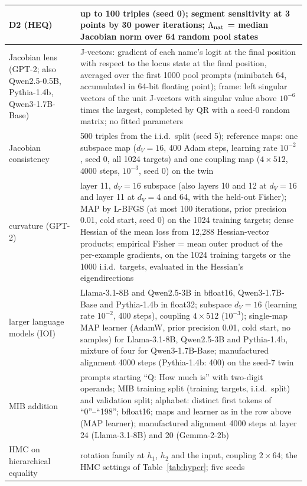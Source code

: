 \documentclass[11pt,a4paper]{article}
\newcommand{\dv}{d_V}
\begin{document}
\begin{table}[htbp]
\begin{tabular}{p{}p{}}
D2 (HEQ) & up to 100 triples (seed 0); segment sensitivity at 3 points by 30 power iterations; $\Lambda_{\rm nat}$ = median Jacobian norm over 64 random pool states\\
\midrule
Jacobian lens (GPT-2; also Qwen2.5-0.5B, Pythia-1.4b, Qwen3-1.7B-Base) & J-vectors: gradient of each name's logit at the final position with respect to the locus state at the final position, averaged over the first 1000 pool prompts (minibatch 64, accumulated in 64-bit floating point); frame: left singular vectors of the unit J-vectors with singular value above $10^{-6}$ times the largest, completed by QR with a seed-0 random matrix; no fitted parameters\\
Jacobian consistency & 500 triples from the i.i.d.\ split (seed 5); reference maps: one subspace map ($\dv=16$, 400 Adam steps, learning rate $10^{-2}$, seed 0, all 1024 targets) and one coupling map ($4\times512$, 4000 steps, $10^{-3}$, seed 0) on the twin\\
curvature (GPT-2) & layer 11, $\dv=16$ subspace (also layers 10 and 12 at $\dv=16$ and layer 11 at $\dv=4$ and 64, with the held-out Fisher); MAP by L-BFGS (at most 100 iterations, prior precision 0.01, cold start, seed 0) on the 1024 training targets; dense Hessian of the mean loss from 12{,}288 Hessian-vector products; empirical Fisher = mean outer product of the per-example gradients, on the 1024 training targets or the 1000 i.i.d.\ targets, evaluated in the Hessian's eigendirections\\
\midrule
larger language models (IOI) & Llama-3.1-8B and Qwen2.5-3B in bfloat16, Qwen3-1.7B-Base and Pythia-1.4b in float32; subspace $\dv=16$ (learning rate $10^{-2}$, 400 steps), coupling $4\times512$ ($10^{-3}$); single-map MAP learner (AdamW, prior precision 0.01, cold start, no samples) for Llama-3.1-8B, Qwen2.5-3B and Pythia-1.4b, mixture of four for Qwen3-1.7B-Base; manufactured alignment 4000 steps (Pythia-1.4b: 400) on the seed-7 twin\\
MIB addition & prompts starting ``Q: How much is'' with two-digit operands; MIB training split (training targets, i.i.d.\ split) and validation split; alphabet: distinct first tokens of ``0''--``198''; bfloat16; maps and learner as in the row above (MAP learner); manufactured alignment 4000 steps at layer 24 (Llama-3.1-8B) and 20 (Gemma-2-2b)\\
HMC on hierarchical equality & rotation family at $h_1$, $h_2$ and the input, coupling $2\times64$; the HMC settings of Table~\ref{tab:hyper}; five seeds\\
\bottomrule
\end{tabular}
\end{table}
\end{document}
